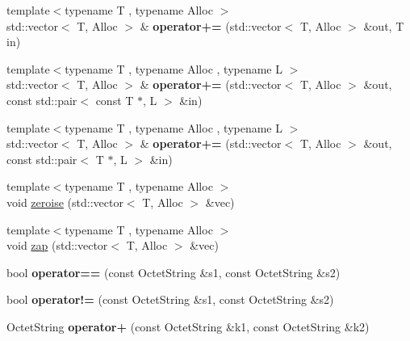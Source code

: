 \begin{DoxyCompactItemize}
\item 
\mbox{\label{namespace_botan_a906697de956a6e0d5a61249aa3bb525f}} 
{\footnotesize template$<$typename T , typename Alloc $>$ }\\std\+::vector$<$ T, Alloc $>$ \& {\bfseries operator+=} (std\+::vector$<$ T, Alloc $>$ \&out, T in)
\item 
\mbox{\label{namespace_botan_a723c2af7ffb9a2e5165f95db713c55d3}} 
{\footnotesize template$<$typename T , typename Alloc , typename L $>$ }\\std\+::vector$<$ T, Alloc $>$ \& {\bfseries operator+=} (std\+::vector$<$ T, Alloc $>$ \&out, const std\+::pair$<$ const T $\ast$, L $>$ \&in)
\item 
\mbox{\label{namespace_botan_a777e3c75fe36a1a4933b1ad4a8ce9b07}} 
{\footnotesize template$<$typename T , typename Alloc , typename L $>$ }\\std\+::vector$<$ T, Alloc $>$ \& {\bfseries operator+=} (std\+::vector$<$ T, Alloc $>$ \&out, const std\+::pair$<$ T $\ast$, L $>$ \&in)
\item 
{\footnotesize template$<$typename T , typename Alloc $>$ }\\void \mbox{\hyperlink{namespace_botan_a09ce987463cc4e1b7682f31bb486fdb1}{zeroise}} (std\+::vector$<$ T, Alloc $>$ \&vec)
\item 
{\footnotesize template$<$typename T , typename Alloc $>$ }\\void \mbox{\hyperlink{namespace_botan_a2534f0fffcfe960b963990832bd1d26e}{zap}} (std\+::vector$<$ T, Alloc $>$ \&vec)
\item 
\mbox{\label{namespace_botan_a551a515f0c61404596b130f180baca42}} 
bool {\bfseries operator==} (const Octet\+String \&s1, const Octet\+String \&s2)
\item 
\mbox{\label{namespace_botan_ada1b5d6af0e8a9c167560d38612b9093}} 
bool {\bfseries operator!=} (const Octet\+String \&s1, const Octet\+String \&s2)
\item 
\mbox{\label{namespace_botan_a416b93dfc9f85cf4cd340496569771df}} 
Octet\+String {\bfseries operator+} (const Octet\+String \&k1, const Octet\+String \&k2)
\item 
\mbox{\label{namespace_botan_a3865365c1278cbbd08338bc0936d42ca}} 

\end{DoxyCompactItemize}
